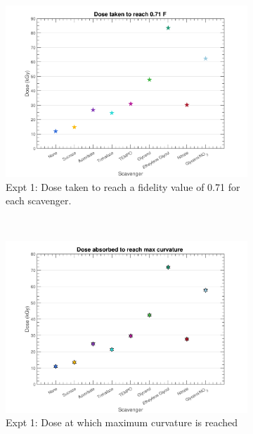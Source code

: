 \begin{figure}
    \centering
    \begin{subfigure}[b]{1.0\textwidth}
            \centering
            \includegraphics[width=\textwidth]{figures/saxs/ScavengerComparisonPlot.pdf}
            \caption{Expt 1: Dose taken to reach a fidelity value of 0.71 for each scavenger.}
            \label{fig:Scavenger plot - arbitrary fidelity value}
    \end{subfigure}
    \\
    \begin{subfigure}[b]{1.0\textwidth}
            \centering
            \includegraphics[width=\textwidth]{figures/saxs/ScavengerCurvatureComparisonPlot.pdf}
            \caption{Expt 1: Dose at which maximum curvature is reached}
            \label{fig:Scavenger plot - maximum curvature}
    \end{subfigure}
    \caption[Radiation damage onset threshold dose values for both metrics used to assess the fidelity values.]{}
    \label{fig:Combined Scavenger results - Rebecca data}
\end{figure}

